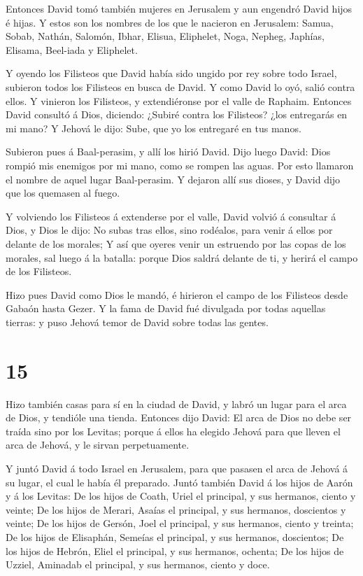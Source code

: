  Entonces David tomó también mujeres en Jerusalem y aun
engendró David hijos é hijas.  Y estos son los nombres de
los que le nacieron en Jerusalem: Samua, Sobab, Nathán, Salomón,
 Ibhar, Elisua, Eliphelet,  Noga, Nepheg,
Japhías,  Elisama, Beel-iada y Eliphelet.

 Y oyendo los Filisteos que David había sido ungido por rey
sobre todo Israel, subieron todos los Filisteos en busca de David. Y
como David lo oyó, salió contra ellos.  Y vinieron los
Filisteos, y extendiéronse por el valle de Raphaim. 
Entonces David consultó á Dios, diciendo: ¿Subiré contra los Filisteos?
¿los entregarás en mi mano? Y Jehová le dijo: Sube, que yo los entregaré
en tus manos.

 Subieron pues á Baal-perasim, y allí los hirió David. Dijo
luego David: Dios rompió mis enemigos por mi mano, como se rompen las
aguas. Por esto llamaron el nombre de aquel lugar Baal-perasim.
 Y dejaron allí sus dioses, y David dijo que los quemasen
al fuego.

 Y volviendo los Filisteos á extenderse por el valle,
 David volvió á consultar á Dios, y Dios le dijo: No subas
tras ellos, sino rodéalos, para venir á ellos por delante de los
morales;  Y así que oyeres venir un estruendo por las copas
de los morales, sal luego á la batalla: porque Dios saldrá delante de
ti, y herirá el campo de los Filisteos.

 Hizo pues David como Dios le mandó, é hirieron el campo de
los Filisteos desde Gabaón hasta Gezer.  Y la fama de David
fué divulgada por todas aquellas tierras: y puso Jehová temor de David
sobre todas las gentes.

\hypertarget{section-14}{%
\section{15}\label{section-14}}

 Hizo también casas para sí en la ciudad de David, y labró
un lugar para el arca de Dios, y tendióle una tienda. 
Entonces dijo David: El arca de Dios no debe ser traída sino por los
Levitas; porque á ellos ha elegido Jehová para que lleven el arca de
Jehová, y le sirvan perpetuamente.

 Y juntó David á todo Israel en Jerusalem, para que pasasen
el arca de Jehová á su lugar, el cual le había él preparado.
 Juntó también David á los hijos de Aarón y á los Levitas:
 De los hijos de Coath, Uriel el principal, y sus hermanos,
ciento y veinte;  De los hijos de Merari, Asaías el
principal, y sus hermanos, doscientos y veinte;  De los
hijos de Gersón, Joel el principal, y sus hermanos, ciento y treinta;
 De los hijos de Elisaphán, Semeías el principal, y sus
hermanos, doscientos;  De los hijos de Hebrón, Eliel el
principal, y sus hermanos, ochenta;  De los hijos de
Uzziel, Aminadab el principal, y sus hermanos, ciento y doce.

